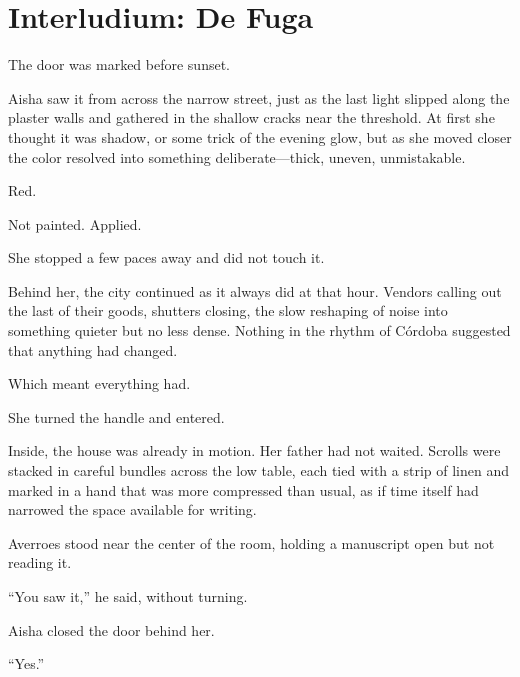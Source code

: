 
\chapter*{Interludium: De Fuga}


The door was marked before sunset.

Aisha saw it from across the narrow street, just as the last light slipped along the
plaster walls and gathered in the shallow cracks near the threshold. At first she
thought it was shadow, or some trick of the evening glow, but as she moved closer
the color resolved into something deliberate---thick, uneven, unmistakable.

Red.

Not painted. Applied.

She stopped a few paces away and did not touch it.

Behind her, the city continued as it always did at that hour. Vendors calling out the
last of their goods, shutters closing, the slow reshaping of noise into something quieter
but no less dense. Nothing in the rhythm of Córdoba suggested that anything had
changed.

Which meant everything had.

She turned the handle and entered.

Inside, the house was already in motion. Her father had not waited. Scrolls were
stacked in careful bundles across the low table, each tied with a strip of linen and
marked in a hand that was more compressed than usual, as if time itself had narrowed
the space available for writing.

Averroes stood near the center of the room, holding a manuscript open but not
reading it.

``You saw it,'' he said, without turning.

Aisha closed the door behind her.

``Yes.''

